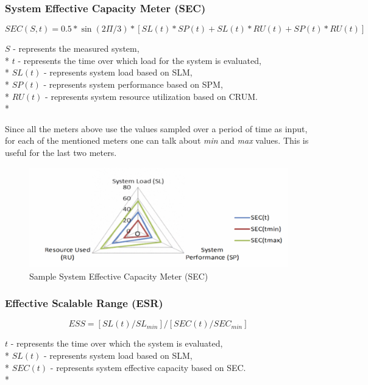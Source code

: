 \documentclass{uvamscse}
\begin{document}
\subsubsection{System Effective Capacity Meter (SEC)}
\begin{center}
  $$SEC(S,t) = 0.5 * \sin(2\Pi/3) * [SL(t)*SP(t)+SL(t)*RU(t)+SP(t)*RU(t)]$$
\end{center}
  \texttt{$S$} - represents the measured system, \\*
  \texttt{$t$} - represents the time over which load for the system is evaluated, \\*
  \texttt{$SL(t)$} - represents system load based on SLM, \\*
  \texttt{$SP(t)$} - represents system performance based on SPM, \\*
  \texttt{$RU(t)$} - represents system resource utilization based on CRUM. \\*

Since all the meters above use the values sampled over a period of time as input, for each of the mentioned meters one can talk about \textit{min} and \textit{max} values. This is useful for the last two meters.

\begin{figure}[h]
\centering
\includegraphics[scale=0.3]{sec}
\caption{Sample System Effective Capacity Meter (SEC)}
\label{figure:sec}
\end{figure}

\subsubsection{Effective Scalable Range (ESR)}
\begin{center}
  $$ESS = [SL(t) / SL_{min}] / [SEC(t) / SEC_{min}]$$
\end{center}
  \texttt{$t$} - represents the time over which the system is evaluated, \\*
  \texttt{$SL(t)$} - represents system load based on SLM, \\*
  \texttt{$SEC(t)$} - represents system effective capacity based on SEC. \\*
\end{document}
